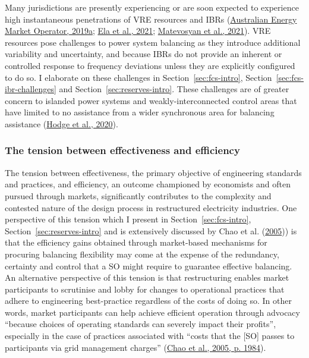 \documentclass[12pt,a4paper,]{report}
\begin{document}
Many jurisdictions are presently experiencing or are soon expected to
experience high instantaneous penetrations of VRE resources and IBRs
(\protect\hyperlink{ref-australianenergymarketoperatorMaintainingPowerSystem2019}{Australian
Energy Market Operator, 2019a};
\protect\hyperlink{ref-elaElectricityMarketFuture2021}{Ela et al.,
2021};
\protect\hyperlink{ref-matevosyanFutureInverterBasedResources2021}{Matevosyan
et al., 2021}). VRE resources pose challenges to power system balancing
as they introduce additional variability and uncertainty, and because
IBRs do not provide an inherent or controlled response to frequency
deviations unless they are explicitly configured to do so. I elaborate
on these challenges in Section~\ref{sec:fcs-intro},
Section~\ref{sec:fcs-ibr-challenges} and
Section~\ref{sec:reserves-intro}. These challenges are of greater
concern to islanded power systems and weakly-interconnected control
areas that have limited to no assistance from a wider synchronous area
for balancing assistance
(\protect\hyperlink{ref-hodgeAddressingTechnicalChallenges2020}{Hodge et
al., 2020}).

\hypertarget{the-tension-between-effectiveness-and-efficiency}{%
\subsubsection{The tension between effectiveness and
efficiency}\label{the-tension-between-effectiveness-and-efficiency}}

The tension between effectiveness, the primary objective of engineering
standards and practices, and efficiency, an outcome championed by
economists and often pursued through markets, significantly contributes
to the complexity and contested nature of the design process in
restructured electricity industries. One perspective of this tension
which I present in Section~\ref{sec:fcs-intro},
Section~\ref{sec:reserves-intro} and is extensively discussed by Chao et
al. (\protect\hyperlink{ref-chaoInterfaceEngineeringMarket2005}{2005}))
is that the efficiency gains obtained through market-based mechanisms
for procuring balancing flexibility may come at the expense of the
redundancy, certainty and control that a SO might require to guarantee
effective balancing. An alternative perspective of this tension is that
restructuring enables market participants to scrutinise and lobby for
changes to operational practices that adhere to engineering
best-practice regardless of the costs of doing so. In other words,
market participants can help achieve efficient operation through
advocacy ``because choices of operating standards can severely impact
their profits'', especially in the case of practices associated with
``costs that the {[}SO{]} passes to participants via grid management
charges''
(\protect\hyperlink{ref-chaoInterfaceEngineeringMarket2005}{Chao et al.,
2005, p. 1984}).
\end{document}
